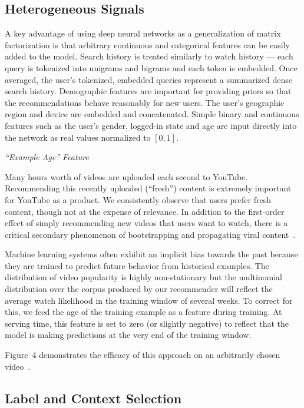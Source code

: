 \subsection{Heterogeneous Signals}

A key advantage of using deep neural networks as a generalization of matrix
factorization is that arbitrary continuous and categorical features can be
easily added to the model. Search history is treated similarly to watch
history --- each query is tokenized into unigrams and bigrams and each token
is embedded. Once averaged, the user's tokenized, embedded queries represent
a summarized dense search history. Demographic features are important for
providing priors so that the recommendations behave reasonably for new users.
The user's geographic region and device are embedded and concatenated. Simple
binary and continuous features such as the user's gender, logged-in state and
age are input directly into the network as real values normalized to
$[0, 1]$.

\textit{``Example Age'' Feature}

Many hours worth of videos are uploaded each second to YouTube. Recommending
this recently uploaded (``fresh'') content is extremely important for
YouTube as a product. We consistently observe that users prefer fresh
content, though not at the expense of relevance. In addition to the
first-order effect of simply recommending new videos that users want to
watch, there is a critical secondary phenomenon of bootstrapping and
propagating viral content~\cite{jiang2014viral}.

Machine learning systems often exhibit an implicit bias towards the past
because they are trained to predict future behavior from historical examples.
The distribution of video popularity is highly non-stationary but the
multinomial distribution over the corpus produced by our recommender will
reflect the average watch likelihood in the training window of several weeks.
To correct for this, we feed the age of the training example as a feature
during training. At serving time, this feature is set to zero (or slightly
negative) to reflect that the model is making predictions at the very end of
the training window.

Figure~4 demonstrates the efficacy of this approach on an arbitrarily chosen
video~\cite{zayn2016pillowtalk}.

\subsection{Label and Context Selection}

